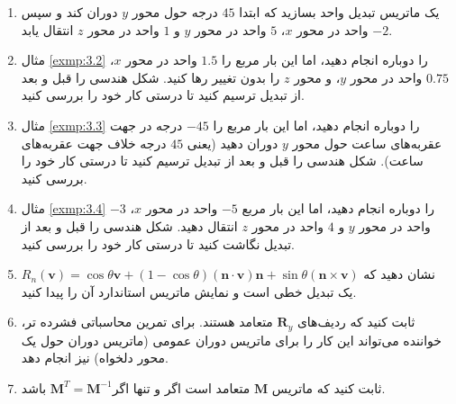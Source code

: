 {\begin{spacing}{1.5}
\begin{enumerate}[label=\textbf{\arabic*}.]
            \item {یک ماتریس تبدیل واحد بسازید که ابتدا $45$ درجه حول محور $y$ دوران کند و سپس $-2$ واحد در محور $x$، $5$ واحد در محور $y$ و $1$ واحد در محور $z$ انتقال یابد.} \\\textbf{\vspace{6pt}}

            \item {مثال \ref{exmp:3.2} را دوباره انجام دهید، اما این بار مربع را $1.5$ واحد در محور $x$، $0.75$ واحد در محور $y$، و محور $z$ را بدون تغییر رها کنید.
            شکل هندسی را قبل و بعد از تبدیل ترسیم کنید تا درستی کار خود را بررسی کنید.} \\\textbf{\vspace{6pt}}

            \item {مثال \ref{exmp:3.3} را دوباره انجام دهید، اما این بار مربع را $-45$ درجه در جهت عقربه‌های ساعت حول محور $y$ دوران دهید (یعنی $45$ درجه خلاف جهت عقربه‌های ساعت).
            شکل هندسی را قبل و بعد از تبدیل ترسیم کنید تا درستی کار خود را بررسی کنید.} \\\textbf{\vspace{6pt}}

            \item {مثال \ref{exmp:3.4} را دوباره انجام دهید، اما این بار مربع $-5$ واحد در محور $x$، $-3$ واحد در محور $y$ و $4$ واحد در محور $z$ انتقال دهید.
            شکل هندسی را قبل و بعد از تبدیل نگاشت کنید تا درستی کار خود را بررسی کنید.} \\\textbf{\vspace{6pt}}

            \item {نشان دهید که $R_{n}(\textbf{v})=\cos\theta\textbf{v}+(1-\cos\theta)(\textbf{n}\cdot\textbf{v})\textbf{n}+\sin\theta(\textbf{n}\times\textbf{v})$ یک تبدیل خطی است و نمایش ماتریس استاندارد آن را پیدا کنید.} \\\textbf{\vspace{6pt}}

            \item {ثابت کنید که ردیف‌های $\textbf{R}_{y}$ متعامد هستند. برای تمرین محاسباتی فشرده تر، خواننده می‌تواند این کار را برای ماتریس دوران عمومی (ماتریس دوران حول یک محور دلخواه) نیز انجام دهد.} \\\textbf{\vspace{6pt}}

            \item {ثابت کنید که ماتریس $\textbf{M}$ متعامد است اگر و تنها اگر$\textbf{M}^{T}=\textbf{M}^{-1}$ باشد.} \\\textbf{\vspace{6pt}}


\end{enumerate}
\end{spacing}}
